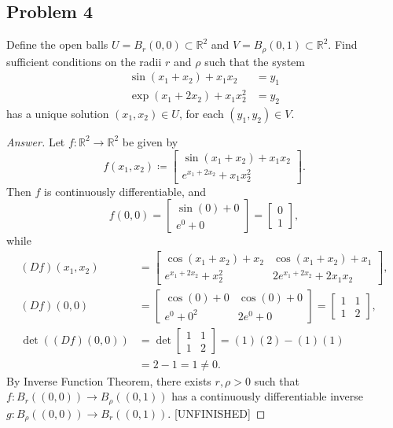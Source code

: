 \documentclass[12pt]{article}
\newcommand{\real}{\mathbb{R}}
\newcommand\paren[1]{\left( #1 \right)}
\theoremstyle{definition}
\begin{document}
\subsection{Problem 4}
Define the open balls $U = B_r(0,0) \subset \real^2$ and $V = B_{\rho}(0,1) \subset \real^2$. Find sufficient conditions on the radii $r$ and $\rho$ such that the system 
\begin{align*}
    \sin \paren{ x_1 + x_2 } + x_1 x_2 & = y_1 \\
    \exp \paren{ x_1 + 2x_2 } + x_1 x_2^2 & = y_2
\end{align*}
has a unique solution $\paren{ x_1 , x_2 } \in U$, for each $\paren{ y_1 , y_2 } \in V$.
\begin{proof}[Answer]
    Let $f : \real^2 \to \real^2$ be given by 
    \[
        f \paren{ x_1 , x_2 } \coloneqq 
        \begin{bmatrix}
            \sin \paren{ x_1 + x_2 } + x_1 x_2 \\ 
            e^{x_1 + 2x_2} + x_1 x_2^2
        \end{bmatrix} . 
    \]
    Then $f$ is continuously differentiable, and 
    \[
        f(0,0) = 
        \begin{bmatrix}
            \sin(0) + 0 \\ 
            e^0 + 0
        \end{bmatrix}
        =
        \begin{bmatrix}
            0 \\ 
            1
        \end{bmatrix} , 
    \]
    while 
    \begin{align*}
        (Df) \paren{ x_1 , x_2 } & = 
        \begin{bmatrix}
            \cos \paren{ x_1 + x_2 } + x_2 & \cos \paren{ x_1 + x_2 } + x_1 \\ 
            e^{x_1 + 2x_2} + x_2^2 & 2e^{x_1 + 2x_2} + 2x_1 x_2 
        \end{bmatrix} , \\ 
        (Df) (0,0) & = 
        \begin{bmatrix}
            \cos(0) + 0 & \cos(0) + 0 \\ 
            e^0 + 0^2 & 2e^0 + 0
        \end{bmatrix} 
        =
        \begin{bmatrix}
            1 & 1 \\ 
            1 & 2
        \end{bmatrix} , \\ 
        \det \paren{ (Df) (0,0) } & = \det 
        \begin{bmatrix}
            1 & 1 \\ 
            1 & 2
        \end{bmatrix} 
        = (1)(2) - (1)(1) \\ 
        & = 2 - 1 = 1 \neq 0 . 
    \end{align*}
    By Inverse Function Theorem, there exists $r , \rho > 0$ such that $f : B_r((0,0)) \to B_{\rho}((0,1))$ has a continuously differentiable inverse $g : B_{\rho}((0,0)) \to B_{r}((0,1))$. [UNFINISHED]
\end{proof}
\end{document}
